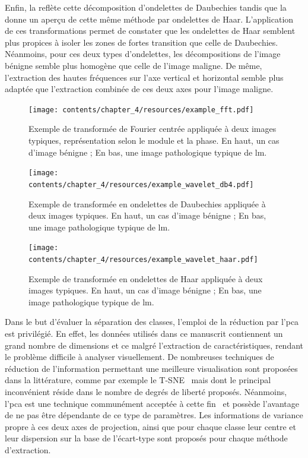 Enfin, la  reflète cette décomposition d'ondelettes de Daubechies tandis que la  donne un aperçu de cette même méthode par ondelettes de Haar. L'application de ces transformations permet de constater que les ondelettes de Haar semblent plus propices à isoler les zones de fortes transition que celle de Daubechies. Néanmoins, pour ces deux types d'ondelettes, les décompositions de l'image bénigne semble plus homogène que celle de l'image maligne. De même, l'extraction des hautes fréquences sur l'axe vertical et horizontal semble plus adaptée que l'extraction combinée de ces deux axes pour l'image maligne.\par

\begin{figure}[H]
    \centering
    \texttt{[image: contents/chapter\_4/resources/example\_fft.pdf]}
    \caption{Exemple de transformée de Fourier centrée appliquée à deux images typiques, représentation selon le module et la phase. En haut, un cas d'image bénigne ; En bas, une image pathologique typique de \gls{lm}.}
    \label{fig:example_fft}
\end{figure}\par

\begin{figure}[H]
    \centering
    \texttt{[image: contents/chapter\_4/resources/example\_wavelet\_db4.pdf]}
    \caption{Exemple de transformée en ondelettes de Daubechies appliquée à deux images typiques. En haut, un cas d'image bénigne ; En bas, une image pathologique typique de \gls{lm}.}
    \label{fig:example_wavelet_db4}
\end{figure}\par

\begin{figure}[H]
    \centering
    \texttt{[image: contents/chapter\_4/resources/example\_wavelet\_haar.pdf]}
    \caption{Exemple de transformée en ondelettes de Haar appliquée à deux images typiques. En haut, un cas d'image bénigne ; En bas, une image pathologique typique de \gls{lm}.}
    \label{fig:example_wavelet_haar}
\end{figure}\par

Dans le but d'évaluer la séparation des classes, l'emploi de la réduction par l'\gls{pca} est privilégié. En effet, les données utilisés dans ce manuscrit contiennent un grand nombre de dimensions et ce malgré l'extraction de caractéristiques, rendant le problème difficile à analyser visuellement. De nombreuses techniques de réduction de l'information permettant une meilleure visualisation sont proposées dans la littérature, comme par exemple le T-SNE~\cite{Maaten2008} mais dont le principal inconvénient réside dans le nombre de degrés de liberté proposés. Néanmoins, l'\gls{pca} est une technique communément acceptée à cette fin~\cite{Himberg2001} et possède l'avantage de ne pas être dépendante de ce type de paramètres. Les informations de variance propre à ces deux axes de projection, ainsi que pour chaque classe leur centre et leur dispersion sur la base de l'écart-type sont proposés pour chaque méthode d'extraction.\par

